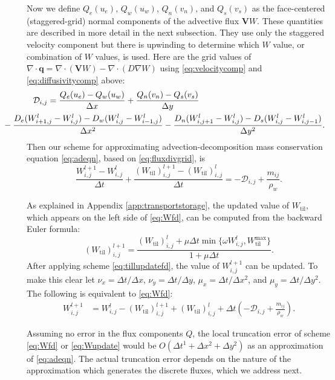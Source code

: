 \documentclass[11pt,final]{amsart}
\newcommand\bV{\mathbf{V}}
\newcommand\bq{\mathbf{q}}
\newcommand{\Div}{\nabla\cdot}
\newcommand{\grad}{\nabla}
\newcommand{\Wtil}{W_{\text{til}}}
\newcommand{\Wtilmax}{W_{\text{til}}^{\text{max}}}
\newcommand{\Wlij}{W^l_{i,j}}
\begin{document}
Now we define $Q_e(u_e)$, $Q_w(u_w)$, $Q_n(v_n)$, and $Q_s(v_s)$ as the face-centered (staggered-grid) normal components of the advective flux $\bV W$.  These quantities are described in more detail in the next subsection.  They use only the staggered velocity component but there is upwinding to determine which $W$ value, or combination of $W$ values, is used.  Here are the grid values of $\Div \bq = \Div (\bV W) - \Div (D \grad W)$ using \eqref{eq:velocitycomp} and \eqref{eq:diffusivitycomp} above:
\begin{align}
&\mathcal{D}_{i,j} =  \frac{Q_e(u_e) - Q_w(u_w)}{\Delta x} + \frac{Q_n(v_n) - Q_s(v_s)}{\Delta y}  \label{eq:fluxdivgrid} \\
   &\hspace{-0.5in} - \frac{D_e (W_{i+1,j}^l - \Wlij) - D_w (\Wlij - W_{i-1,j}^l)}{\Delta x^2} - \frac{D_n (W_{i,j+1}^l - \Wlij) - D_s (\Wlij - W_{i,j-1}^l)}{\Delta y^2}.  \notag
\end{align}
Then our scheme for approximating advection-decomposition mass conservation equation \eqref{eq:adeqn}, based on \eqref{eq:fluxdivgrid}, is
\begin{equation}
\frac{W_{i,j}^{l+1} - W_{i,j}^l}{\Delta t} + \frac{(\Wtil)_{i,j}^{l+1} - (\Wtil)_{i,j}^l}{\Delta t} = - \mathcal{D}_{i,j} + \frac{m_{ij}}{\rho_w}.    \label{eq:Wfd}
\end{equation}

As explained in Appendix \ref{app:transportstorage}, the updated value of $\Wtil$, which appears on the left side of \eqref{eq:Wfd}, can be computed from the backward Euler formula:
\begin{equation}
(\Wtil)_{i,j}^{l+1} = \frac{(\Wtil)_{i,j}^l + \mu \Delta t \min\{\omega W_{i,j}^l, \Wtilmax\}}{1 + \mu \Delta t}.  \label{eq:tillupdatefd}
\end{equation}
After applying scheme \eqref{eq:tillupdatefd}, the value of $W_{i,j}^{l+1}$ can be updated.  To make this clear let $\nu_x = \Delta t/\Delta x$, $\nu_y = \Delta t/\Delta y$, $\mu_x = \Delta t/\Delta x^2$, and $\mu_y = \Delta t/\Delta y^2$.  The following is equivalent to \eqref{eq:Wfd}:
\begin{align}
 W_{i,j}^{l+1} &= W_{i,j}^l - (\Wtil)_{i,j}^{l+1} + (\Wtil)_{i,j}^l + \Delta t \left(-\mathcal{D}_{i,j} +  \frac{m_{ij}}{\rho_w}\right). \label{eq:Wupdate}
\end{align}

Assuming no error in the flux components $Q$, the local truncation error \citep{MortonMayers} of scheme \eqref{eq:Wfd} or \eqref{eq:Wupdate} would be $O(\Delta t^1 + \Delta x^2 + \Delta y^2)$ as an approximation of \eqref{eq:adeqn}.  The actual truncation error depends on the nature of the approximation which generates the discrete fluxes, which we address next.
\end{document}
